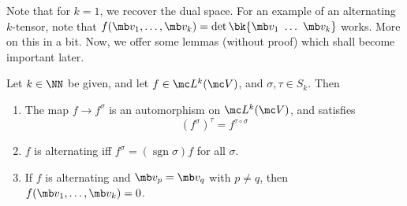 \documentclass{fkbook}
\theoremstyle{snazzydefinition}
\DeclareMathOperator{\sgn}{sgn}
\begin{document}
  Note that for $k=1$, we recover the dual space. For an example of an
  alternating $k$-tensor, note that $f(\mb v_1, \ldots, \mb v_k) =
  \det \bk{\mb v_1\ \ldots\ \mb v_k}$ works. More on this in a bit.
  Now, we offer some lemmas (without proof) which shall become
  important later.
  \begin{lemma}
    Let $k \in \NN$ be given, and let $f \in \mc L^k(\mc V)$, and
    $\sigma, \tau \in S_k$. Then
    \begin{enumerate}
      \item The map $f \to f^\sigma$ is an automorphism on $\mc
        L^k(\mc V)$, and satisfies
        \[
          (f^\sigma)^\tau = f^{\tau \circ \sigma}
        \]
      \item $f$ is alternating iff $f^\sigma = (\sgn \sigma)f$ for all
        $\sigma$.
      \item If $f$ is alternating and $\mb v_p = \mb v_q$ with $p \neq
        q$, then $f(\mb v_1, \ldots, \mb v_k) = 0$.
    \end{enumerate}
  \end{lemma}
\end{document}
